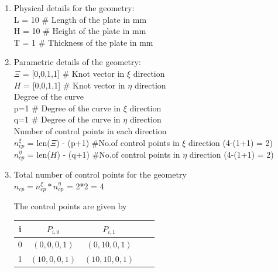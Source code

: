 \documentclass[11pt]{article}
\begin{document}
\begin{enumerate}
	\item Physical details for the geometry: \\
	L = 10 \qquad \# Length of the plate in mm \\
	H = 10 \qquad \# Height of the plate in mm \\
	T =  1 {}  \qquad \# Thickness of the plate in mm \\
	
	\item Parametric details of the geometry: \\
	$\Xi$ = [0,0,1,1] \qquad \# Knot vector in $\xi$  direction \\
	$H$ = [0,0,1,1] \qquad \# Knot vector in $\eta$ direction \\
	
	Degree of the curve \\
	p=1 \qquad \# Degree of the curve in $\xi$  direction \\
	q=1 \qquad \# Degree of the curve in $\eta$ direction \\
	
	Number of control points in each direction \\
	$n_{cp}^{\xi}$  = len($\Xi$) - (p+1)  \qquad \#No.of control points in $\xi$
	direction (4-(1+1) = 2) \\
	$n_{cp}^{\eta}$ = len($H$) - (q+1)  \qquad \#No.of control points in $\eta$
	direction (4-(1+1) = 2) \\
	
	\item Total number of control points for the geometry \\
	$n_{cp} = n_{cp}^{\xi} * n_{cp}^{\eta}$ = 2*2 = 4\\

	The control points are given by
	\begin{center}
		\begin{tabular}{ |c|c|c|c|c| } 
			\hline
			i & $ P_{i,0} $ & $ P_{i,1} $  \\ \hline
			0 & $ (0,0,0,1) $ & $ (0,10,0,1) $  \\ \hline
			1 & $ (10,0,0,1) $ & $ (10,10,0,1) $  \\ \hline
			

\end{tabular}
\end{center}
\end{enumerate}
\end{document}
